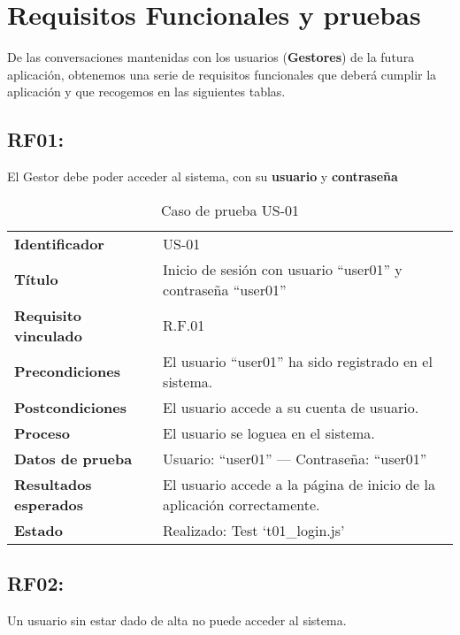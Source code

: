 \section{Requisitos Funcionales y pruebas}
De las conversaciones mantenidas con los usuarios (\textbf{Gestores}) de la futura aplicación, obtenemos una serie de requisitos funcionales que deberá cumplir la aplicación y que recogemos en las siguientes tablas.
\clearpage
\subsection*{RF01:} El Gestor debe poder acceder al sistema, con su \textbf{usuario} y \textbf{\textbf{contraseña}}

\setlength{\tabcolsep}{6pt}      

\begin{table}[H]
	\centering
	\small %
	\caption{Caso de prueba US-01}
	\label{tab:caso_us01}
	\begin{tabular}{>{\bfseries}l p{11cm}} %
		Identificador & US-01 \\
		Título & Inicio de sesión con usuario “user01” y contraseña “user01” \\
		Requisito vinculado & R.F.01 \\
		Precondiciones & El usuario “user01” ha sido registrado en el sistema. \\
		Postcondiciones & El usuario accede a su cuenta de usuario. \\
		Proceso & El usuario se loguea en el sistema. \\
		Datos de prueba & Usuario: “user01” — Contraseña: “user01” \\
		Resultados esperados & El usuario accede a la página de inicio de la aplicación correctamente. \\
		Estado & Realizado: Test `t01\_login.js' \\
	\end{tabular}
\end{table}

\subsection*{RF02:} Un usuario sin estar dado de alta no puede acceder al sistema.

